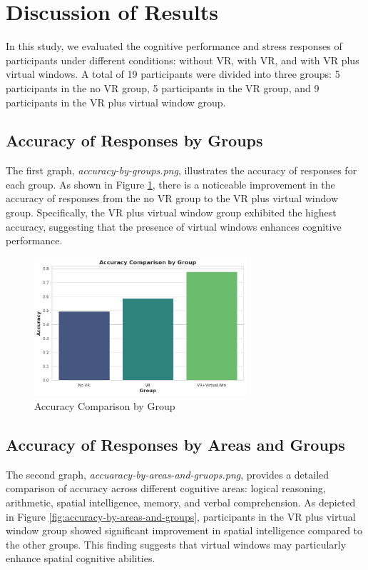 \documentclass[runningheads]{llncs}
\begin{document}
\section{Discussion of Results}

In this study, we evaluated the cognitive performance and stress responses of participants under different conditions: without VR, with VR, and with VR plus virtual windows. A total of 19 participants were divided into three groups: 5 participants in the no VR group, 5 participants in the VR group, and 9 participants in the VR plus virtual window group.

\subsection{Accuracy of Responses by Groups}

The first graph, \textit{accuracy-by-groups.png}, illustrates the accuracy of responses for each group. As shown in Figure \ref{fig:accuracy-by-groups}, there is a noticeable improvement in the accuracy of responses from the no VR group to the VR plus virtual window group. Specifically, the VR plus virtual window group exhibited the highest accuracy, suggesting that the presence of virtual windows enhances cognitive performance.

\begin{figure}[!htbp]
    \centering
    \includegraphics[width=0.7\textwidth]{img/accuracy-by-groups.png}
    \caption{Accuracy Comparison by Group}
    \label{fig:accuracy-by-groups}
\end{figure}

\subsection{Accuracy of Responses by Areas and Groups}

The second graph, \textit{accuaracy-by-areas-and-gruops.png}, provides a detailed comparison of accuracy across different cognitive areas: logical reasoning, arithmetic, spatial intelligence, memory, and verbal comprehension. As depicted in Figure \ref{fig:accuracy-by-areas-and-groups}, participants in the VR plus virtual window group showed significant improvement in spatial intelligence compared to the other groups. This finding suggests that virtual windows may particularly enhance spatial cognitive abilities.
\end{document}
